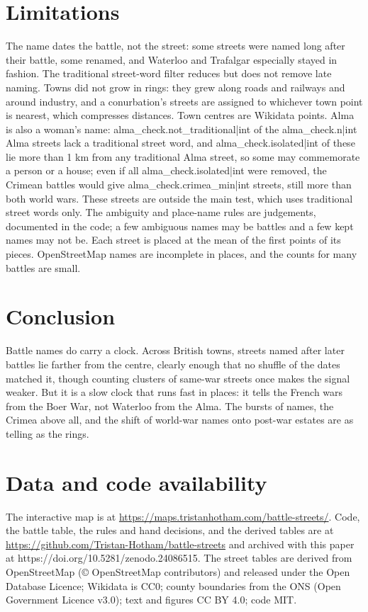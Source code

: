 \documentclass[11pt,a4paper]{article}
\begin{document}
\section{Limitations}
The name dates the battle, not the street: some streets were named long after their battle, some renamed, and Waterloo and Trafalgar especially stayed in fashion. The traditional street-word filter reduces but does not remove late naming. Towns did not grow in rings: they grew along roads and railways and around industry, and a conurbation's streets are assigned to whichever town point is nearest, which compresses distances. Town centres are Wikidata points. Alma is also a woman's name: {{alma_check.not_traditional|int}} of the {{alma_check.n|int}} Alma streets lack a traditional street word, and {{alma_check.isolated|int}} of these lie more than 1 km from any traditional Alma street, so some may commemorate a person or a house; even if all {{alma_check.isolated|int}} were removed, the Crimean battles would give {{alma_check.crimea_min|int}} streets, still more than both world wars. These streets are outside the main test, which uses traditional street words only. The ambiguity and place-name rules are judgements, documented in the code; a few ambiguous names may be battles and a few kept names may not be. Each street is placed at the mean of the first points of its pieces. OpenStreetMap names are incomplete in places, and the counts for many battles are small.

\section{Conclusion}
Battle names do carry a clock. Across British towns, streets named after later battles lie farther from the centre, clearly enough that no shuffle of the dates matched it, though counting clusters of same-war streets once makes the signal weaker. But it is a slow clock that runs fast in places: it tells the French wars from the Boer War, not Waterloo from the Alma. The bursts of names, the Crimea above all, and the shift of world-war names onto post-war estates are as telling as the rings.

\section*{Data and code availability}
The interactive map is at \url{https://maps.tristanhotham.com/battle-streets/}. Code, the battle table, the rules and hand decisions, and the derived tables are at \url{https://github.com/Tristan-Hotham/battle-streets} and archived with this paper at https://doi.org/10.5281/zenodo.24086515. The street tables are derived from OpenStreetMap (\copyright{} OpenStreetMap contributors) and released under the Open Database Licence; Wikidata is CC0; county boundaries from the ONS (Open Government Licence v3.0); text and figures CC BY 4.0; code MIT.
\end{document}
